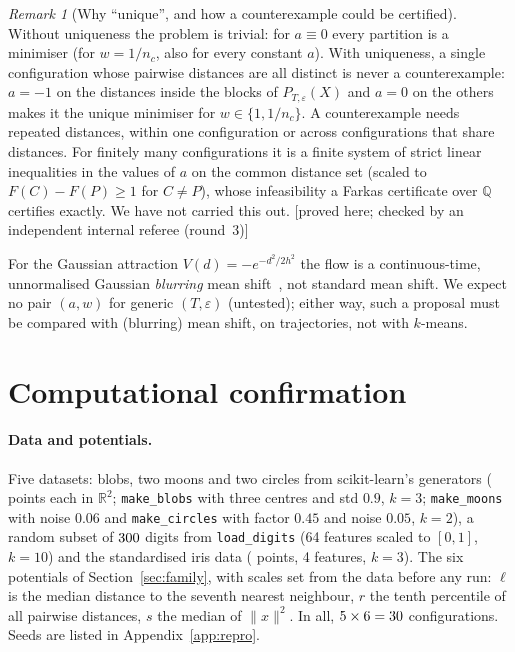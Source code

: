 \documentclass[11pt,a4paper]{article}
\theoremstyle{plain}
\theoremstyle{definition}
\theoremstyle{remark}
\newtheorem{remark}[theorem]{Remark}
\newcommand{\R}{\mathbb{R}}
\newcommand{\Q}{\mathbb{Q}}
\newcommand{\status}[1]{\textsf{\small [#1]}}
\newcommand{\rthree}{checked by an independent internal referee (round~3)}
\begin{document}
\begin{remark}[Why ``unique'', and how a counterexample could be certified]\label{rem:dyn}
Without uniqueness the problem is trivial: for $a\equiv0$ every partition is a minimiser (for $w=1/n_c$, also for every constant $a$). With uniqueness, a single configuration whose pairwise distances are all distinct is never a counterexample: $a=-1$ on the distances inside the blocks of $P_{T,\varepsilon}(X)$ and $a=0$ on the others makes it the unique minimiser for $w\in\{1,1/n_c\}$. A counterexample needs repeated distances, within one configuration or across configurations that share distances. For finitely many configurations it is a finite system of strict linear inequalities in the values of $a$ on the common distance set (scaled to $F(C)-F(P)\ge1$ for $C\ne P$), whose infeasibility a Farkas certificate over $\Q$ certifies exactly. We have not carried this out. \status{proved here; \rthree}
\end{remark}

\noindent For the Gaussian attraction $V(d)=-e^{-d^2/2h^2}$ the flow is a continuous-time, unnormalised Gaussian \emph{blurring} mean shift~\citep{cheng1995}, not standard mean shift. We expect no pair $(a,w)$ for generic $(T,\varepsilon)$ (untested); either way, such a proposal must be compared with (blurring) mean shift, on trajectories, not with $k$-means.

\section{Computational confirmation}\label{sec:experiments}

\paragraph{Data and potentials.} Five datasets: blobs, two moons and two circles from scikit-learn's generators (\Nsynth{} points each in $\R^2$; \texttt{make\_blobs} with three centres and std $0.9$, $k=3$; \texttt{make\_moons} with noise $0.06$ and \texttt{make\_circles} with factor $0.45$ and noise $0.05$, $k=2$), a random subset of $300$ digits from \texttt{load\_digits} (64 features scaled to $[0,1]$, $k=10$) and the standardised iris data (\Niris{} points, 4 features, $k=3$). The six potentials of Section~\ref{sec:family}, with scales set from the data before any run: $\ell$ is the median distance to the seventh nearest neighbour, $r$ the tenth percentile of all pairwise distances, $s$ the median of $\lVert x\rVert^2$. In all, $5\times6=30$ configurations. Seeds are listed in Appendix~\ref{app:repro}.
\end{document}
